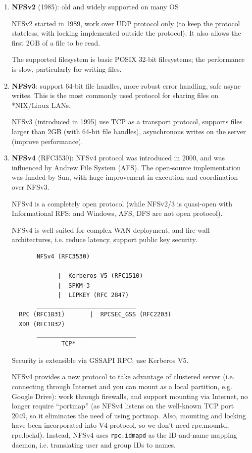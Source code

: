 \begin{enumerate}

  \item {\bf NFSv2} (1985): old and widely supported on many OS

NFSv2 started in 1989, work over UDP protocol only (to keep the protocol
stateless, with locking implemented outside the protocol). It also allows the
first 2GB of a file to be read.

The supported filesystem is basic POSIX 32-bit filesystems; the performance is
slow, particularly for writing files.

  \item {\bf NFSv3}: support 64-bit file handles, more robust error handling,
  safe async writes. This is the most commonly used protocol for sharing files
  on *NIX/Linux LANs.

NFSv3 (introduced in 1995) use TCP as a transport protocol, supports files
larger than 2GB (with 64-bit file handles), asynchronous writes on the server
(improve performance). 

  \item {\bf NFSv4} (RFC3530): NFSv4 protocol was introduced in 2000, and was
  influenced by Andrew File System (AFS). The open-source implementation was funded by Sun,
  with huge improvement in execution and coordination over NFSv3.
  
  NFSv4 is a completely open protocol (while NFSv2/3 is quasi-open with
  Informational RFS; and Windows, AFS, DFS are not open protocol).
  
  NFSv4 is well-suited for complex WAN deployment, and fire-wall architectures,
  i.e. reduce latency, support public key security.
\begin{verbatim}
       NFSv4 (RFC3530)
       
             |  Kerberos V5 (RFC1510)
             |  SPKM-3
             |  LIPKEY (RFC 2847)
       ____________________________
  RPC (RFC1831)       |  RPCSEC_GSS (RFC2203)
  XDR (RFC1832)       
       ____________________________
              TCP*
\end{verbatim}  
Security is extensible via GSSAPI RPC; use Kerberos V5.

  NFSv4 provides a new protocol to take advantage of clustered server (i.e.
  connecting through Internet and you can mount as a local partition, e.g.
  Google Drive):  work through firewalls, and support mounting via Internet, no
  longer require ``portmap'' (as NFSv4 listens on the well-known TCP port 2049,
  so it eliminates the need of using portmap. Also, mounting and locking have
  been incorporated into V4 protocol, so we don't need rpc.mountd, rpc.lockd).
  Instead, NFSv4 uses \verb!rpc.idmapd! as the ID-and-name mapping daemon, i.e.
  translating user and group IDs to names.
  

\end{enumerate}
